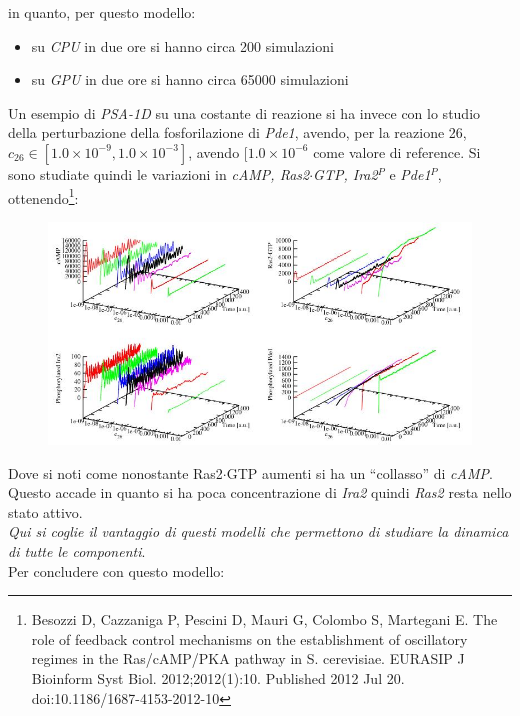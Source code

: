 \documentclass[a4paper,12pt, oneside]{book}
\begin{document}
in quanto, per questo modello:
\begin{itemize}
  \item su \textit{CPU} in due ore si hanno circa 200 simulazioni
  \item su \textit{GPU} in due ore si hanno circa 65000 simulazioni
\end{itemize}
Un esempio di \textit{PSA-1D} su una costante di reazione si ha invece con lo
studio della perturbazione della fosforilazione di \textit{Pde1}, avendo, per la
reazione 26, $c_{26}\in[1.0\times 10^{-9},1.0\times 10^{-3}]$, avendo
$[1.0\times 10^{-6}$ come valore di reference. Si sono studiate quindi le
variazioni in \textit{cAMP, Ras2$\cdot$GTP, Ira2$^P$} e \textit{Pde1}$^P$,
ottenendo\footnote{Besozzi D, Cazzaniga P, Pescini D, 
  Mauri G, 
  Colombo S, Martegani E. The role of feedback control mechanisms on the
  establishment of oscillatory regimes in the Ras/cAMP/PKA pathway in
  S. cerevisiae. EURASIP J Bioinform Syst Biol. 2012;2012(1):10. Published 2012
  Jul 20. doi:10.1186/1687-4153-2012-10}: 
\begin{figure}[H]
  \centering
  \includegraphics[scale = 0.5]{img/glucosimu4.jpg}
\end{figure}
Dove si noti come nonostante  Ras2$\cdot$GTP aumenti si ha un ``collasso'' di
\textit{cAMP}. Questo accade in quanto si ha poca concentrazione di
\textit{Ira2} quindi \textit{Ras2} resta nello stato attivo.\\
\textit{Qui si coglie il vantaggio di questi modelli che permettono di studiare
  la dinamica di tutte le componenti}.\\
Per concludere con questo modello:
\end{document}
